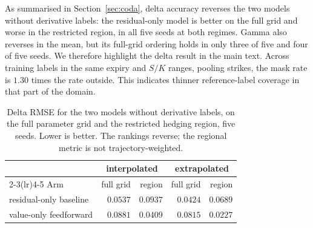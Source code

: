 \documentclass{article}
\begin{document}
As summarised in Section~\ref{sec:coda}, delta accuracy reverses the two models
without derivative labels: the residual-only model is better on the full grid and
worse in the restricted region, in all five seeds at both regimes. Gamma also
reverses in the mean, but its full-grid ordering holds in only three of five and
four of five seeds. We therefore highlight the delta result in the main text.
Across training labels in the same expiry and $S/K$ ranges, pooling strikes, the
mask rate is $1.30$ times the rate outside. This indicates thinner reference-label
coverage in that part of the domain.

\begin{table}[!htbp]
\caption{Delta RMSE for the two models without derivative labels, on the full
parameter grid and the restricted hedging region, five seeds. Lower is better.
The rankings reverse; the regional metric is not trajectory-weighted.}
\label{tab:region}
\centering\footnotesize\setlength{\tabcolsep}{6pt}
\begin{tabular}{@{}lrrrr@{}}
\toprule
& \multicolumn{2}{c}{interpolated} & \multicolumn{2}{c}{extrapolated} \\
\cmidrule(lr){2-3}\cmidrule(lr){4-5}
Arm & full grid & region & full grid & region \\
\midrule
residual-only baseline & $\mathbf{0.0537}$ & $0.0937$ & $\mathbf{0.0424}$ & $0.0689$ \\
value-only feedforward & $0.0881$ & $\mathbf{0.0409}$ & $0.0815$ & $\mathbf{0.0227}$ \\
\bottomrule
\end{tabular}
\end{table}
\end{document}
